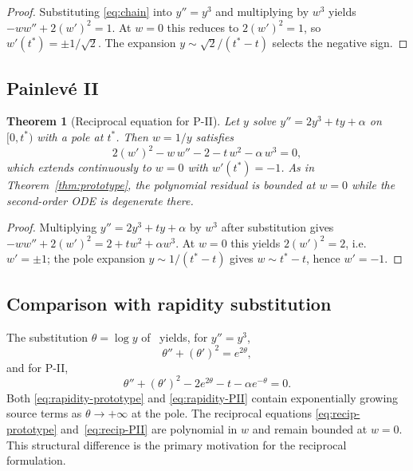 \documentclass[11pt,a4paper]{article}
\newtheorem{theorem}{Theorem}
\theoremstyle{definition}
\begin{document}
\begin{proof}
Substituting \eqref{eq:chain} into $y''=y^3$ and multiplying by $w^3$
yields $-ww'' + 2(w')^2 = 1$. At $w=0$ this reduces to
$2(w')^2 = 1$, so $w'(t^*) = \pm 1/\sqrt{2}$. The expansion
$y \sim \sqrt{2}/(t^*-t)$ selects the negative sign.
\end{proof}

\subsection{Painlev\'e II}

\begin{theorem}[Reciprocal equation for P-II]
\label{thm:PII}
Let $y$ solve $y'' = 2y^3 + ty + \alpha$ on $[0,t^*)$ with a pole at
$t^*$. Then $w = 1/y$ satisfies
\begin{equation}
2(w')^2 - w\,w'' - 2 - t\,w^2 - \alpha\,w^3 = 0,
\label{eq:recip-PII}
\end{equation}
which extends continuously to $w=0$ with $w'(t^*) = -1$. As in Theorem~\ref{thm:prototype}, the polynomial residual is bounded at $w=0$ while the second-order ODE is degenerate there.
\end{theorem}

\begin{proof}
Multiplying $y'' = 2y^3 + ty + \alpha$ by $w^3$ after substitution
gives $-ww'' + 2(w')^2 = 2 + tw^2 + \alpha w^3$.
At $w=0$ this yields $2(w')^2 = 2$, i.e.\ $w' = \pm 1$; the pole
expansion $y \sim 1/(t^*-t)$ gives $w \sim t^*-t$, hence $w'=-1$.
\end{proof}

\subsection{Comparison with rapidity substitution}

The substitution $\theta = \log y$ of~\citet{Cayuso2025} yields,
for $y''=y^3$,
\begin{equation}
\theta'' + (\theta')^2 = e^{2\theta},
\label{eq:rapidity-prototype}
\end{equation}
and for P-II,
\begin{equation}
\theta'' + (\theta')^2 - 2e^{2\theta} - t - \alpha e^{-\theta} = 0.
\label{eq:rapidity-PII}
\end{equation}
Both \eqref{eq:rapidity-prototype} and \eqref{eq:rapidity-PII} contain
exponentially growing source terms as $\theta \to +\infty$ at the pole.
The reciprocal equations \eqref{eq:recip-prototype} and~\eqref{eq:recip-PII}
are polynomial in $w$ and remain bounded at $w=0$. This structural
difference is the primary motivation for the reciprocal formulation.
\end{document}
